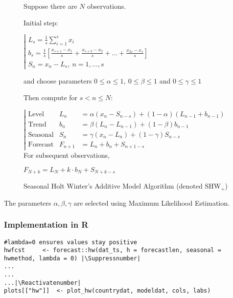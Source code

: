 \begin{figure}[H]
\centering
\begin{tcolorbox}[width=.65\textwidth]%

Suppose there are $N$ observations.

Initial step:

$\left|\begin{array}{l}
L_s = \frac1s \sum_{i=1}^s x_i \\
b_s = \frac1s \left[\frac{x_{s+1}-x_1}{s}+\frac{x_{s+2}-x_2}{s}+\dots+\frac{x_{2s}-x_s}{s}\right]\\
S_n  = x_n-L_s, \ n=1,\dots,s
\end{array}\right.$

and choose parameters $0\leq\alpha\leq1,\ 0\leq\beta\leq1$ and $0\leq\gamma\leq1$

Then compute for $s<n\leq N$:

$\left|\begin{array}{lll}
\text{Level} &       L_n & = \alpha (x_n-S_{n-s})+(1-\alpha)(L_{n-1}+b_{n-1})\\
\text{Trend} &      b_n & = \beta(L_n-L_{n-1})+(1-\beta)b_{n-1}\\
\text{Seasonal} & S_n & = \gamma (x_n-L_n) + (1-\gamma)S_{n-s}\\
\text{Forecast} & F_{n+1} & = L_n+b_n+S_{n+1-s}
\end{array}\right.$
For subsequent observations,

$F_{N+k}=L_N+k\cdot b_N+S_{N+k-s}$
\label{SHWx}
\end{tcolorbox}
\caption{Seasonal Holt Winter’s Additive Model Algorithm (denoted SHW$_{+}$)}
\end{figure}

The parameters $\alpha,\beta,\gamma$ are selected using Maximum Likelihood Estimation.

\subsubsection{Implementation in R}

\begin{lstlisting}[breaklines = true, escapeinside=||, tabsize = 4, caption = {Algorithm for HoltWinters Model}]
#lambda=0 ensures values stay positive
hwfcst     <- forecast::hw(dat_ts, h = forecastlen, seasonal = hwmethod, lambda = 0) |\Suppressnumber|
...
...
...|\Reactivatenumber|
plots[["hw"]]  <- plot_hw(countrydat, modeldat, cols, labs)
\end{lstlisting}

